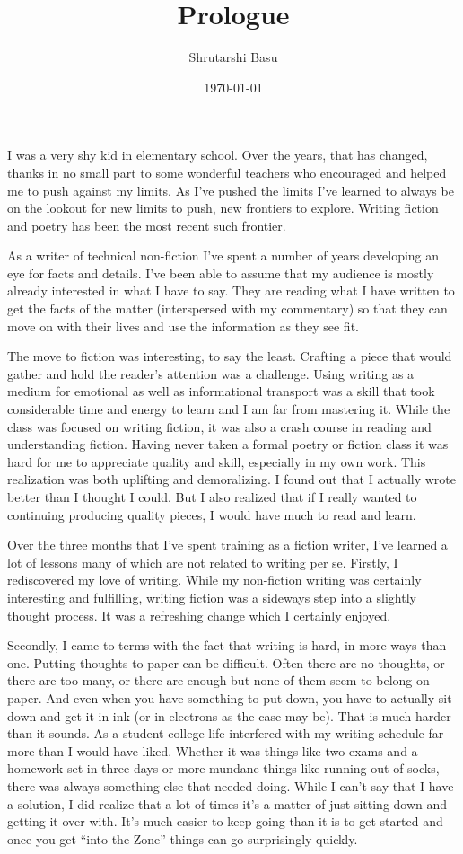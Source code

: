 \documentclass[12pt,letterpaper]{article}
\title{Prologue}
\author{Shrutarshi Basu}
\date{\today}
\begin{document}
\maketitle
\doublespacing


I was a very shy kid in elementary school. Over the years, that has changed, thanks in no small part to some wonderful teachers who encouraged and helped me to push against my limits. As I've pushed the limits I've learned to always be on the lookout for new limits to push, new frontiers to explore. Writing fiction and poetry has been the most recent such frontier.

As a writer of technical non-fiction I've spent a number of years developing an eye for facts and details. I've been able to assume that my audience is mostly already interested in what I have to say. They are reading what I have written to get the facts of the matter (interspersed with my commentary) so that they can move on with their lives and use the information as they see fit. 

The move to fiction was interesting, to say the least. Crafting a piece that would gather and hold the reader's attention was a challenge. Using writing as a medium for emotional as well as informational transport was a skill that took considerable time and energy to learn and I am far from mastering it. While the class was focused on writing fiction, it was also a crash course in reading and understanding fiction. Having never taken a formal poetry or fiction class it was hard for me to appreciate quality and skill, especially in my own work. This realization was both uplifting and demoralizing. I found out that I actually wrote better than I thought I could. But I also realized that if I really wanted to continuing producing quality pieces, I would have much to read and learn.

Over the three months that I've spent training as a fiction writer, I've learned a lot of lessons many of which are not related to writing per se. Firstly, I rediscovered my love of writing. While my non-fiction writing was certainly interesting and fulfilling, writing fiction was a sideways step into a slightly thought process. It was a refreshing change which I certainly enjoyed.

Secondly, I came to terms with the fact that writing is hard, in more ways than one. Putting thoughts to paper can be difficult. Often there are no thoughts, or there are too many, or there are enough but none of them seem to belong on paper. And even when you have something to put down, you have to actually sit down and get it in ink (or in electrons as the case may be). That is much harder than it sounds. As a student college life interfered with my writing schedule far more than I would have liked. Whether it was things like two exams and a homework set in three days or more mundane things like running out of socks, there was always something else that needed doing. While I can't say that I have a solution, I did realize that a lot of times it's a matter of just sitting down and getting it over with. It's much easier to keep going than it is to get started and once you get ``into the Zone'' things can go surprisingly quickly.
\end{document}

